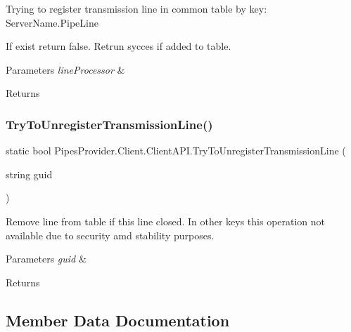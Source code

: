 Trying to register transmission line in common table by key\+: Server\+Name.\+Pipe\+Line 

If exist return false. Retrun sycces if added to table. 


\begin{DoxyParams}{Parameters}
{\em line\+Processor} & \\
\hline
\end{DoxyParams}
\begin{DoxyReturn}{Returns}

\end{DoxyReturn}
\mbox{\label{class_pipes_provider_1_1_client_1_1_client_a_p_i_a20139222de5ce13aa336e7c4db174f91}} 
\subsubsection{\texorpdfstring{Try\+To\+Unregister\+Transmission\+Line()}{TryToUnregisterTransmissionLine()}}
{\footnotesize\ttfamily static bool Pipes\+Provider.\+Client.\+Client\+A\+P\+I.\+Try\+To\+Unregister\+Transmission\+Line (\begin{DoxyParamCaption}\item[{string}]{guid }\end{DoxyParamCaption})\hspace{0.3cm}{\ttfamily [static]}}



Remove line from table if this line closed. In other keys this operation not available due to security amd stability purposes. 


\begin{DoxyParams}{Parameters}
{\em guid} & \\
\hline
\end{DoxyParams}
\begin{DoxyReturn}{Returns}

\end{DoxyReturn}


\subsection{Member Data Documentation}
\mbox{\label{class_pipes_provider_1_1_client_1_1_client_a_p_i_aafef8e556d18d889412c1f48451250c4}} 
